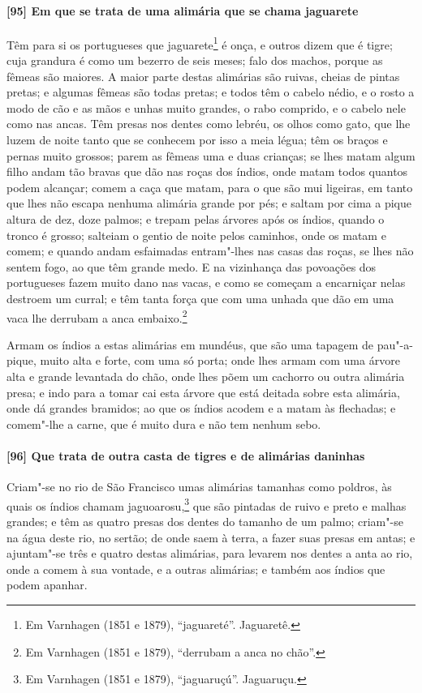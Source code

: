 \paragraph{[95] Em que se trata de uma alimária que se chama jaguarete}\quad
Têm para si os portugueses que jaguarete\footnote{ Em Varnhagen (1851 e 1879),
``jaguareté''. Jaguaretê.} é onça, e outros dizem que é tigre; cuja grandura é como um
bezerro de seis meses; falo dos machos, porque as fêmeas são maiores. A maior parte destas
alimárias são ruivas, cheias de pintas pretas; e algumas fêmeas são todas pretas; e todos
têm o cabelo nédio, e o rosto a modo de cão e as mãos e unhas muito grandes, o rabo
comprido, e o cabelo nele como nas ancas. Têm presas nos dentes como lebréu, os olhos como
gato, que lhe luzem de noite tanto que se conhecem por isso a meia légua; têm os braços e
pernas muito grossos; parem as fêmeas uma e duas crianças; se lhes matam algum filho andam
tão bravas que dão nas roças dos índios, onde matam todos quantos podem alcançar; comem a
caça que matam, para o que são mui ligeiras, em tanto que lhes não escapa nenhuma alimária
grande por pés; e saltam por cima a pique altura de dez, doze palmos; e trepam pelas
árvores após os índios, quando o tronco é grosso; salteiam o gentio de noite pelos
caminhos, onde os matam e comem; e quando andam esfaimadas entram"-lhes nas casas das
roças, se lhes não sentem fogo, ao que têm grande medo. E na vizinhança das povoações dos
portugueses fazem muito dano nas vacas, e como se começam a encarniçar nelas destroem um
curral; e têm tanta força que com uma unhada que dão em uma vaca lhe derrubam a anca
embaixo.\footnote{ Em Varnhagen (1851 e 1879), ``derrubam a anca no chão''.}

Armam os índios a estas alimárias em mundéus, que são uma tapagem de pau"-a-pique, muito
alta e forte, com uma só porta; onde lhes armam com uma árvore alta e grande levantada do
chão, onde lhes põem um cachorro ou outra alimária presa; e indo para a tomar cai esta
árvore que está deitada sobre esta alimária, onde dá grandes bramidos; ao que os índios
acodem e a matam às flechadas; e comem"-lhe a carne, que é muito dura e não tem nenhum
sebo.

\paragraph{[96] Que trata de outra casta de tigres e de alimárias daninhas}\quad
Criam"-se no rio de São Francisco umas alimárias tamanhas como poldros, às quais os índios
chamam jaguoarosu,\footnote{ Em Varnhagen (1851 e 1879), ``jaguaruçú''. Jaguaruçu.} que
são pintadas de ruivo e preto e malhas grandes; e têm as quatro presas dos dentes do
tamanho de um palmo; criam"-se na água deste rio, no sertão; de onde saem à terra, a fazer
suas presas em antas; e ajuntam"-se três e quatro destas alimárias, para levarem nos dentes
a anta ao rio, onde a comem à sua vontade, e a outras alimárias; e também aos índios que
podem apanhar.

